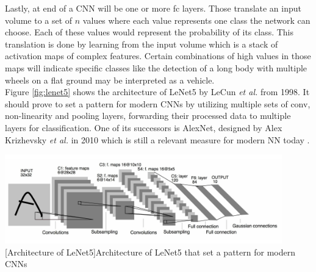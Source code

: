 Lastly, at end of a \ac{CNN} will be one or more \ac{fc} layers. Those translate an input volume to a set of $n$ values where each value represents one class the network can choose. Each of these values would represent the probability of its class. This translation is done by learning from the input volume which is a stack of activation maps of complex features. Certain combinations of high values in those maps will indicate specific classes like the detection of a long body with multiple wheels on a flat ground may be interpreted as a vehicle.\\
Figure \ref{fig:lenet5} shows the architecture of LeNet5 by LeCun \textit{et al.} \cite{Lecun98gradient-basedlearning} from 1998. It should prove to set a pattern for modern \acp{CNN} by utilizing multiple sets of \ac{conv}, non-linearity and pooling layers, forwarding their processed data to multiple layers for classification. One of its successors is AlexNet, designed by Alex Krizhevsky \textit{et al.} in 2010 \cite{NIPS2012_4824} which is still a relevant measure for modern \ac{NN} today \cite{DBLP:journals/corr/CanzianiPC16}.

\begin{center}
\noindent\includegraphics[width=12cm]{tex/img/ch03/LeNet5.png}
[Architecture of LeNet5]{Architecture of LeNet5 that set a pattern for modern \acp{CNN} \cite{Lecun98gradient-basedlearning}}
\label{fig:lenet5}
\end{center}

